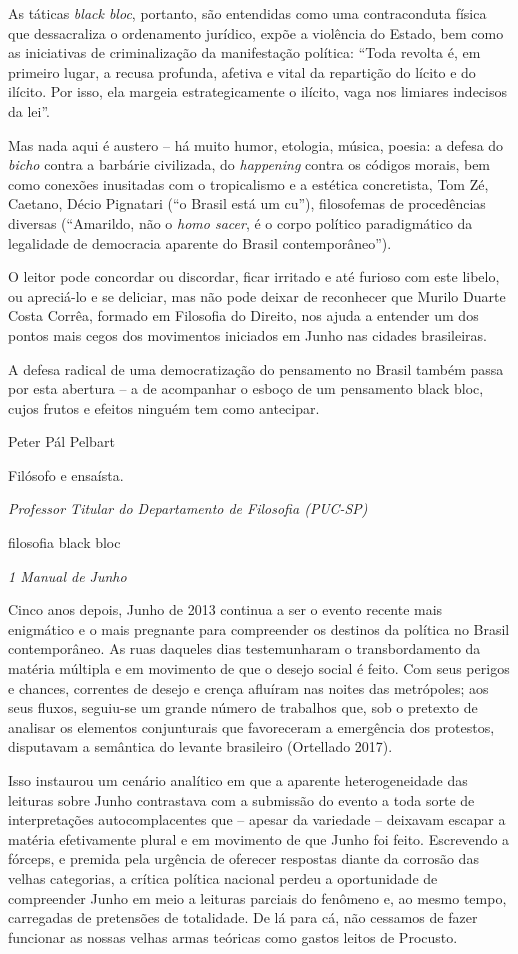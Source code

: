 As táticas \emph{black bloc}, portanto,\emph{ }são entendidas como uma
contraconduta física que dessacraliza o ordenamento jurídico, expõe a
violência do Estado, bem como as iniciativas de criminalização da
manifestação política: ``Toda revolta é, em primeiro lugar, a recusa
profunda, afetiva e vital da repartição do lícito e do ilícito. Por
isso, ela margeia estrategicamente o ilícito, vaga nos limiares
indecisos da lei''.

Mas nada aqui é austero -- há muito humor, etologia, música, poesia: a
defesa do \emph{bicho} contra a barbárie civilizada, do \emph{happening
}contra os códigos morais, bem como conexões inusitadas com o
tropicalismo e a estética concretista, Tom Zé, Caetano, Décio Pignatari
(``o Brasil está um cu''), filosofemas de procedências diversas
(``Amarildo, não o \emph{homo sacer}, é o corpo político paradigmático
da legalidade de democracia aparente do Brasil contemporâneo'').

O leitor pode concordar ou discordar, ficar irritado e até furioso com
este libelo, ou apreciá-lo e se deliciar, mas não pode deixar de
reconhecer que Murilo Duarte Costa Corrêa, formado em Filosofia do
Direito, nos ajuda a entender um dos pontos mais cegos dos movimentos
iniciados em Junho nas cidades brasileiras.

A defesa radical de uma democratização do pensamento no Brasil também
passa por esta abertura -- a de acompanhar o esboço de um pensamento
black bloc, cujos frutos e efeitos ninguém tem como antecipar.

Peter Pál Pelbart

Filósofo e ensaísta.~

\emph{\emph{Professor Titular do Departamento de Filosofia (PUC-SP)}}

filosofia black bloc

\emph{1 Manual de Junho}

Cinco anos depois, Junho de 2013 continua a ser o evento recente mais
enigmático e o mais pregnante para compreender os destinos da política
no Brasil contemporâneo. As ruas daqueles dias testemunharam o
transbordamento da matéria múltipla e em movimento de que o desejo
social é feito. Com seus perigos e chances, correntes de desejo e crença
afluíram nas noites das metrópoles; aos seus fluxos, seguiu-se um grande
número de trabalhos que, sob o pretexto de analisar os elementos
conjunturais que favoreceram a emergência dos protestos, disputavam a
semântica do levante brasileiro (Ortellado 2017).

Isso instaurou um cenário analítico em que a aparente heterogeneidade
das leituras sobre Junho contrastava com a submissão do evento a toda
sorte de interpretações autocomplacentes que -- apesar da variedade --
deixavam escapar a matéria efetivamente plural e em movimento de que
Junho foi feito. Escrevendo a fórceps, e premida pela urgência de
oferecer respostas diante da corrosão das velhas categorias, a crítica
política nacional perdeu a oportunidade de compreender Junho em meio a
leituras parciais do fenômeno e, ao mesmo tempo, carregadas de
pretensões de totalidade. De lá para cá, não cessamos de fazer funcionar
as nossas velhas armas teóricas como gastos leitos de Procusto.

